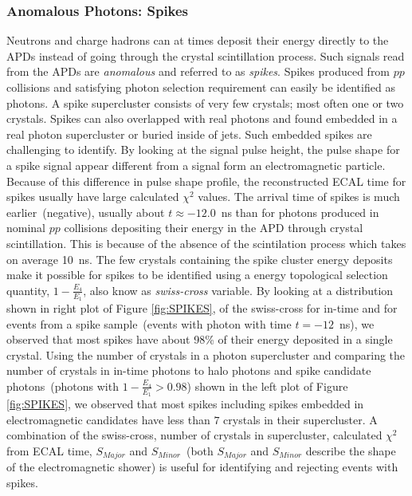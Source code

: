 \subsubsection{Anomalous Photons: Spikes}
Neutrons and charge hadrons can at times deposit their energy directly to the APDs instead of going through the crystal scintillation process. Such signals read from the APDs are \textit{anomalous}  and referred to as \textit{spikes}. Spikes produced from $pp$ collisions and satisfying photon selection requirement can easily be identified as photons. A spike supercluster consists of very few crystals; most often one or two crystals. Spikes can also overlapped with real photons and found embedded in a real photon supercluster or buried inside of jets. Such embedded spikes are challenging to identify. By looking at the signal pulse height, the pulse shape for a spike signal appear different from a signal form an electromagnetic particle. Because of this difference in pulse shape profile, the reconstructed ECAL time for spikes usually have large calculated $\chi^{2}$ values.
\newline
The arrival time of spikes is much earlier~(negative), usually about $t \approx -12.0$~ns than for photons produced in nominal $pp$ collisions depositing their energy in the APD through crystal scintillation. This is because of the absence of the scintilation process which takes on average 10~ns. The few crystals containing the spike cluster energy deposits make it possible for spikes to be identified using a energy topological selection quantity, $1-\frac{E_{4}}{E_{1}}$, also know as \textit{swiss-cross} variable.  By looking at a distribution shown in right plot of Figure 
\ref{fig:SPIKES}, of the swiss-cross for in-time and for events from a spike sample~(events with photon with time $t = -12$~ns),  we observed that most spikes have about 98\% of their energy deposited in a single crystal.
\newline
Using the number of crystals in a photon supercluster and comparing the number of crystals in in-time photons to halo photons and spike candidate photons~(photons with $1-\frac{E_{4}}{E_{1}}> 0.98$) shown in the left plot of Figure \ref{fig:SPIKES}, we observed that most spikes including spikes embedded in electromagnetic candidates have less than $7$ crystals in their supercluster. A combination of the swiss-cross, number of crystals in supercluster, calculated $\chi^{2}$ from ECAL time, $S_{Major}$ and $ S_{Minor}$~(both $S_{Major}$ and $ S_{Minor}$ describe the shape of the electromagnetic shower) is useful for identifying and rejecting events with spikes.


